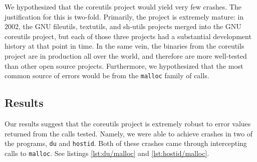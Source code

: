 We hypothesized that the coreutils project would yield very few crashes. The justification for this is two-fold. Primarily, the project is extremely mature: in 2002, the GNU fileutils, textutils, and sh-utils projects merged into the GNU coreutils project, but each of those three projects had a substantial development history at that point in time. In the same vein, the binaries from the coreutils project are in production all over the world, and therefore are more well-tested than other open source projects. Furthermore, we hypothesized that the most common source of errors would be from the \texttt{malloc} family of calls.

\subsection{Results}
Our results suggest that the coreutils project is extremely robust to error values returned from the calls tested. Namely, we were able to achieve crashes in two of the programs, \texttt{du} and \texttt{hostid}. Both of these crashes came through intercepting calls to \texttt{malloc}. See listings \ref{lst:du/malloc} and \ref{lst:hostid/malloc}.
